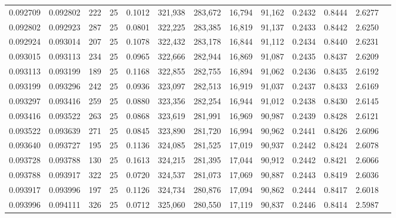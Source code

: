 \begin{tabular}{rrrrrrrrrrrrr}
0.092709 & 0.092802 &   222 &  25 &                                     0.1012 & 321,938 & 283,672 &  16,794 &  91,162 & 0.2432 & 0.8444 & 2.6277 \\
0.092802 & 0.092923 &   287 &  25 &                                     0.0801 & 322,225 & 283,385 &  16,819 &  91,137 & 0.2433 & 0.8442 & 2.6250 \\
0.092924 & 0.093014 &   207 &  25 &                                     0.1078 & 322,432 & 283,178 &  16,844 &  91,112 & 0.2434 & 0.8440 & 2.6231 \\
0.093015 & 0.093113 &   234 &  25 &                                     0.0965 & 322,666 & 282,944 &  16,869 &  91,087 & 0.2435 & 0.8437 & 2.6209 \\
0.093113 & 0.093199 &   189 &  25 &                                     0.1168 & 322,855 & 282,755 &  16,894 &  91,062 & 0.2436 & 0.8435 & 2.6192 \\
0.093199 & 0.093296 &   242 &  25 &                                     0.0936 & 323,097 & 282,513 &  16,919 &  91,037 & 0.2437 & 0.8433 & 2.6169 \\
0.093297 & 0.093416 &   259 &  25 &                                     0.0880 & 323,356 & 282,254 &  16,944 &  91,012 & 0.2438 & 0.8430 & 2.6145 \\
0.093416 & 0.093522 &   263 &  25 &                                     0.0868 & 323,619 & 281,991 &  16,969 &  90,987 & 0.2439 & 0.8428 & 2.6121 \\
0.093522 & 0.093639 &   271 &  25 &                                     0.0845 & 323,890 & 281,720 &  16,994 &  90,962 & 0.2441 & 0.8426 & 2.6096 \\
0.093640 & 0.093727 &   195 &  25 &                                     0.1136 & 324,085 & 281,525 &  17,019 &  90,937 & 0.2442 & 0.8424 & 2.6078 \\
0.093728 & 0.093788 &   130 &  25 &                                     0.1613 & 324,215 & 281,395 &  17,044 &  90,912 & 0.2442 & 0.8421 & 2.6066 \\
0.093788 & 0.093917 &   322 &  25 &                                     0.0720 & 324,537 & 281,073 &  17,069 &  90,887 & 0.2443 & 0.8419 & 2.6036 \\
0.093917 & 0.093996 &   197 &  25 &                                     0.1126 & 324,734 & 280,876 &  17,094 &  90,862 & 0.2444 & 0.8417 & 2.6018 \\
0.093996 & 0.094111 &   326 &  25 &                                     0.0712 & 325,060 & 280,550 &  17,119 &  90,837 & 0.2446 & 0.8414 & 2.5987 \\

\end{tabular}
